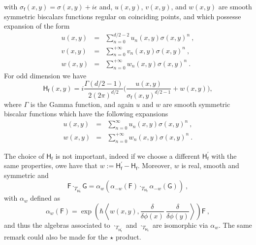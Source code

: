 \documentclass[10pt]{book}
\newcommand{\sm}[1]{\left\langle#1\right\rangle}
\newcommand{\Fsf}{\mathsf{F}}
\newcommand{\Gsf}{\mathsf{G}}
\newcommand{\Hsf}{\mathsf{H}}
\newcommand{\fsf}{\mathsf{f}}
\theoremstyle{break}
\begin{document}
%
with $\sigma_\fsf(x,y) = \sigma(x,y) + i \epsilon$ and, $u(x,y)$, $v(x,y)$, and $w(x,y)$ are smooth symmetric biscalars functions regular on coinciding points, and which possesse expansion of the form
%
\begin{eqnarray*}
u(x,y) &=& \sum_{n=0}^{d/2-2} u_n(x,y) \sigma(x,y)^n \ , \\
v(x,y) &=& \sum_{n=0}^{+\infty} v_n(x,y) \sigma(x,y)^n \ , \\
w(x,y) &=& \sum_{n=0}^{+\infty} w_n(x,y) \sigma(x,y)^n \ .
\end{eqnarray*}
% 
For odd dimension we have
%
\begin{equation*}
\Hsf_\fsf(x,y) = i \frac{\Gamma(d/2-1)}{2(2\pi)^{d/2}} \bigg( \frac{u(x,y)}{\sigma_\fsf(x,y)^{d/2-1}} + w(x,y) \bigg) ,
\end{equation*}
%
where $\Gamma$ is the Gamma function, and again $u$ and $w$ are smooth symmetric biscalar functions which have the following expansions
%
\begin{eqnarray*}
u(x,y) &=& \sum_{n=0}^{\infty} u_n(x,y) \sigma(x,y)^n \ , \\
w(x,y) &=& \sum_{n=0}^{+\infty} w_n(x,y) \sigma(x,y)^n \ . 
\end{eqnarray*}


The choice of $\Hsf_\fsf$ is not important, indeed if we choose a different $\Hsf^\prime_\fsf$ with the same properties, owe have that $w:=\Hsf^\prime_\fsf - \Hsf_\fsf$. Moreover, $w$ is real, smooth and symmetric and
%
\begin{equation*}
\Fsf \cdot_{T_{\Hsf_\fsf^\prime}} \Gsf = \alpha_w \left(\alpha_{-w}(\Fsf) \cdot_{T_{\Hsf_\fsf}} \alpha_{-w}(\Gsf)\right) \ ,
\end{equation*}
%
with $\alpha_w$ defined as 
%
\begin{equation*}
\alpha_{w}(\Fsf) = \exp\left(\hbar \sm{ w(x,y) , \frac{\delta}{\delta\phi(x)} \ \frac{\delta}{\delta\phi(y)} } \right) \Fsf \ ,
\end{equation*}
%
and thus the algebras associated to $\cdot_{T_{\Hsf_\fsf^\prime}}$ and  $\cdot_{T_{\Hsf_\fsf}}$ are isomorphic via $\alpha_{w}$. The same remark could also be made for the $\star$ product.


\bigskip
\end{document}
